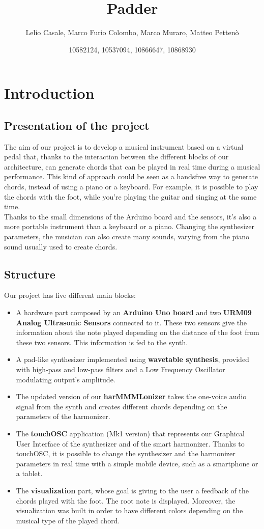 \documentclass{article}
\title{Padder}
\author{Lelio Casale, Marco Furio Colombo, Marco Muraro, Matteo Pettenò}
\date{10582124, 10537094, 10866647, 10868930}
\begin{document}
\maketitle

\section{Introduction}

\subsection{Presentation of the project}

The aim of our project is to develop a musical instrument based on a virtual pedal that, thanks to the interaction between the different blocks of our architecture, can generate chords that can be played in real time during a musical performance. This kind of approach could be seen as a handsfree way to generate chords, instead of using a piano or a keyboard. For example, it is possible to play the chords with the foot, while you’re playing the guitar and singing at the same time. 
\\Thanks to the small dimensions of the Arduino board and the sensors, it’s also a more portable instrument than a keyboard or a piano. Changing the synthesizer parameters, the musician can also create many sounds, varying from the piano sound usually used to create chords.

\subsection{Structure}

Our project has five different main blocks:
\begin{itemize}
    \item A hardware part composed by an \textbf{Arduino Uno board} and two \textbf{URM09 Analog Ultrasonic Sensors} connected to it. These two sensors give the information about the note played depending on the distance of the foot from these two sensors. This information is fed to the synth.
    \item A pad-like synthesizer implemented using \textbf{wavetable synthesis}, provided with high-pass and low-pass filters and a Low Frequency Oscillator modulating output's amplitude.
    \item The updated version of our \textbf{harMMMLonizer} takes the one-voice audio signal from the synth and creates different chords depending on the parameters of the harmonizer.
    \item The \textbf{touchOSC} application (Mk1 version) that represents our Graphical User Interface of the synthesizer and of the smart harmonizer. Thanks to touchOSC, it is possible to change the synthesizer and the harmonizer parameters in real time with a simple mobile device, such as a smartphone or a tablet.
    \item The \textbf{visualization} part, whose goal is giving to the user a feedback of the chords played with the foot. The root note is displayed. Moreover, the visualization was built in order to have different colors depending on the musical type of the played chord.
\end{itemize}
\end{document}
